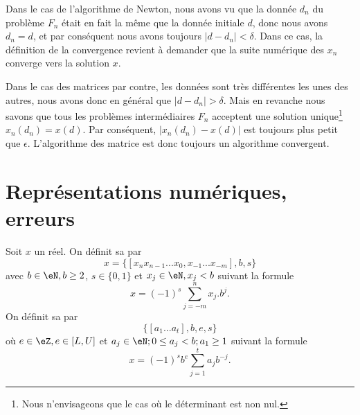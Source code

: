 \begin{remark}      \label{RemConvAlgoNewton}
Dans le cas de l'algorithme de Newton, nous avons vu que la donnée $d_n$ du problème $F_n$ était en fait la même que la donnée initiale $d$, donc nous avons $d_n=d$, et par conséquent nous avons toujours $| d-d_n |<\delta$. Dans ce cas, la définition de la convergence revient à demander que la suite numérique des $x_n$ converge vers la solution $x$.
\end{remark}

\begin{remark}
Dans le cas des matrices par contre, les données sont très différentes les unes des autres, nous avons donc en général que $| d-d_n |>\delta$. Mais en revanche nous savons que tous les problèmes intermédiaires $F_n$ acceptent une solution unique\footnote{Nous n'envisageons que le cas où le déterminant est non nul.} $x_n(d_n)=x(d)$. Par conséquent, $| x_n(d_n)-x(d) |$ est toujours plus petit que $\epsilon$. L'algorithme des matrice est donc toujours un algorithme convergent.
\end{remark}

\section{Représentations numériques, erreurs}

\begin{definition}
	Soit $x$ un réel. On définit sa  par
	\begin{equation}
		x=\{[x_nx_{n-1}...x_0,x_{-1}...x_{-m}], b, s\}
	\end{equation}
	avec  $b\in\eN, b\geq2$, $s\in\{0,1\}$ et $x_j\in\eN,x_j<b$ suivant la formule
	\begin{equation}
		x=(-1)^{s}\sum_{j=-m}^nx_j.b^j.
	\end{equation}
	On définit sa  par
	\begin{equation}
		\{[a_1...a_t],b,e,s\}
	\end{equation}
	où $e\in\eZ,e\in[L,U]$ et $a_j\in\eN;0\leq a_j<b; a_1\geq1$ suivant la formule
	\begin{equation}        \label{EqRepreFlotNOrm}
		x=(-1)^sb^e\sum_{j=1}^ta_jb^{-j}.
	\end{equation}
\end{definition}

